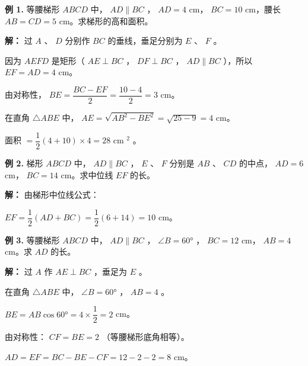 \begin{workedexamples}


\textbf{例 1.} 等腰梯形 $ABCD$ 中， $AD \parallel BC$ ， $AD = 4$ cm， $BC = 10$ cm，腰长 $AB = CD = 5$ cm。求梯形的高和面积。

\textbf{解：}
过 $A$ 、 $D$ 分别作 $BC$ 的垂线，垂足分别为 $E$ 、 $F$ 。

\begin{center}
\label{fig:trapezoid-height}
\end{center}


因为 $AEFD$ 是矩形（ $AE \perp BC$ ， $DF \perp BC$ ， $AD \parallel BC$ ），所以 $EF = AD = 4$ cm。

由对称性， $BE = \dfrac{BC - EF}{2} = \dfrac{10 - 4}{2} = 3$ cm。

在直角 $\triangle ABE$ 中， $AE = \sqrt{AB^2 - BE^2} = \sqrt{25 - 9} = 4$ cm。

面积 $= \dfrac{1}{2}(4 + 10) \times 4 = 28$ cm $^2$ 。

\textbf{例 2.} 梯形 $ABCD$ 中， $AD \parallel BC$ ， $E$ 、 $F$ 分别是 $AB$ 、 $CD$ 的中点， $AD = 6$ cm， $BC = 14$ cm。求中位线 $EF$ 的长。

\textbf{解：}
由梯形中位线公式：

$EF = \dfrac{1}{2}(AD + BC) = \dfrac{1}{2}(6 + 14) = 10$ cm。

\textbf{例 3.} 等腰梯形 $ABCD$ 中， $AD \parallel BC$ ， $\angle B = 60°$ ， $BC = 12$ cm， $AB = 4$ cm。求 $AD$ 的长。

\textbf{解：}
过 $A$ 作 $AE \perp BC$ ，垂足为 $E$ 。

在直角 $\triangle ABE$ 中， $\angle B = 60°$ ， $AB = 4$ 。

$BE = AB \cos 60° = 4 \times \dfrac{1}{2} = 2$ cm。

由对称性： $CF = BE = 2$ （等腰梯形底角相等）。

$AD = EF = BC - BE - CF = 12 - 2 - 2 = 8$ cm。

\end{workedexamples}

